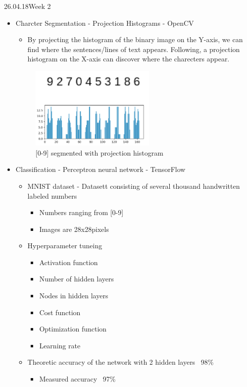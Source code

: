 \documentclass[11pt,a4paper,UKenglish]{article}
\begin{document}
\newpage
\begin{loggentry}{26.04.18}{Week 2}
\begin{itemize}
  \item{Charcter Segmentation - Projection Histograms - OpenCV}
  \begin{itemize}
    \item{By projecting the histogram of the binary image on the Y-axis,
    we can find where the sentences/lines of text appears. Following, a
    projection histogram on the X-axis can discover where the charecters
    appear.}
  \end{itemize}

  \begin{figure}[H]
    \centering
    \includegraphics[height=4cm]{res/0-9_segmented_out.png}
    \caption{[0-9] segmented with projection histogram}
    \label{fig:0-9_segmented_out}
  \end{figure}

  \item{Classification - Perceptron neural network - TensorFlow}
    \begin{itemize}
      \item{MNIST dataset - Datasett consisting of several thousand handwritten
      labeled numbers}
      \begin{itemize}
        \item{Numbers ranging from [0-9]}
        \item{Images are 28x28pixels}
      \end{itemize}
      \item{Hyperparameter tuneing}
      \begin{itemize}
        \item{Activation function}
        \item{Number of hidden layers}
        \item{Nodes in hidden layers}
        \item{Cost function}
        \item{Optimization function}
        \item{Learning rate}
      \end{itemize}
      \item{Theoretic accuracy of the network with 2 hidden layers ~98\%}
      \begin{itemize}
        \item{Measured accuracy ~97\%}


\end{itemize}
\end{itemize}
\end{itemize}
\end{loggentry}
\end{document}
